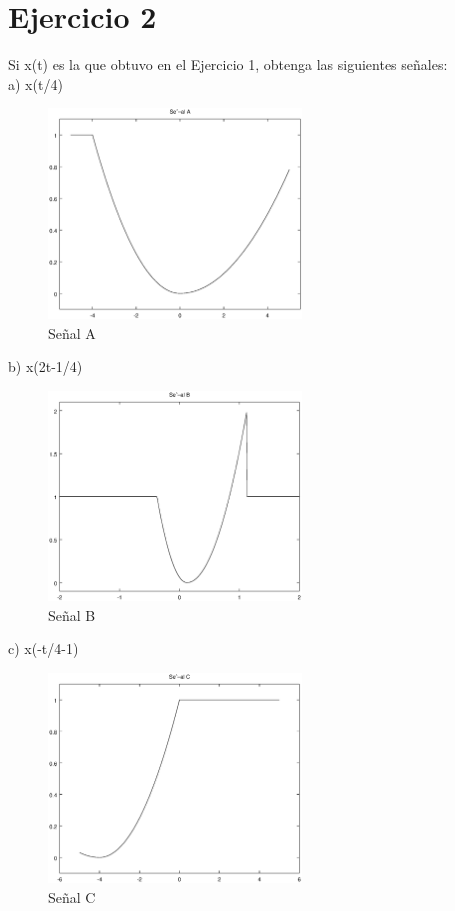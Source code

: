 \documentclass[10pt,a4paper]{report}
\begin{document}
\section{Ejercicio 2}
Si x(t) es la que obtuvo en el Ejercicio 1, obtenga las siguientes señales:\\
a) x(t/4)\\

\begin{figure}[H]
\centering
\includegraphics[width=0.6\textwidth]{SignalA}
\caption{Señal A}
\label{fig:SignalA}
\end{figure}

b) x(2t-1/4)\\

\begin{figure}[H]
\centering
\includegraphics[width=0.6\textwidth]{SignalB}
\caption{Señal B}
\label{fig:SignalB}
\end{figure}

c) x(-t/4-1)\\

\begin{figure}[H]
\centering
\includegraphics[width=0.6\textwidth]{SignalC}
\caption{Señal C}
\label{fig:SignalC}
\end{figure}
\end{document}
